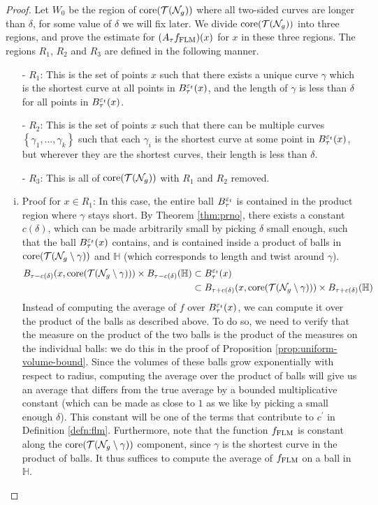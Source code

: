 \begin{proof}
  Let $W_0$ be the region of $\mathrm{core}(\mathcal{T}(\mathcal{N}_g))$ where all two-sided curves are longer than $\delta$, for some value of $\delta$ we will fix later.
  We divide $\mathrm{core}(\mathcal{T}(\mathcal{N}_g))$ into three regions, and prove the estimate for $(A_\tau f_{\mathrm{FLM}})(x)$ for $x$ in these three regions.
  The regions $R_1$, $R_2$ and $R_3$ are defined in the following manner.
  \begin{itemize}
  \item[-] $R_1$: This is the set of points $x$ such that there exists a unique curve $\gamma$ which is the shortest curve at all points in $B_{\tau}^{\varepsilon_t}(x)$, and the length of $\gamma$ is less than $\delta$ for all points in $B_{\tau}^{\varepsilon_t}(x)$.
  \item[-] $R_2$: This is the set of points $x$ such that there can be multiple curves $\left\{ \gamma_1, \ldots, \gamma_k \right\}$ such that each $\gamma_i$ is the shortest curve at some point in $B_{\tau}^{\varepsilon_t}(x)$, but wherever they are the shortest curves, their length is less than $\delta$.
  \item[-] $R_3$: This is all of $\mathrm{core}(\mathcal{T}(\mathcal{N}_g))$ with $R_1$ and $R_2$ removed.
\end{itemize}
  \begin{enumerate}[(i)]
  \item Proof for $x \in R_1$: In this case, the entire ball $B_{\tau}^{\varepsilon_t}$ is contained in the product region where $\gamma$ stays short.
    By Theorem \ref{thm:prno}, there exists a constant $c(\delta)$, which can be made arbitrarily small by picking $\delta$ small enough, such that the ball $B_{\tau}^{\varepsilon_t}(x)$ contains, and is contained inside a product of balls in $\mathrm{core}(\mathcal{T}(\mathcal{N}_g \setminus \gamma))$ and $\mathbb{H}$ (which corresponds to length and twist around $\gamma$).
    \begin{align*}
      B_{\tau - c(\delta)}(x, \mathrm{core}(\mathcal{T}(\mathcal{N}_g \setminus \gamma))) \times B_{\tau - c(\delta)}(\mathbb{H}) &\subset B_{\tau}^{\varepsilon_t}(x) \\
      &\subset B_{\tau + c(\delta)}(x, \mathrm{core}(\mathcal{T}(\mathcal{N}_g \setminus \gamma))) \times B_{\tau + c(\delta)}(\mathbb{H})
    \end{align*}
    Instead of computing the average of $f$ over $B_{\tau}^{\varepsilon_t}(x)$, we can compute it over the product of the balls as described above.
    To do so, we need to verify that the measure on the product of the two balls is the product of the measures on the individual balls: we do this in the proof of Proposition \ref{prop:uniform-volume-bound}.
    Since the volumes of these balls grow exponentially with respect to radius, computing the average over the product of balls will give us an average that differs from the true average by a bounded multiplicative constant (which can be made as close to $1$ as we like by picking a small enough $\delta$).
    This constant will be one of the terms that contribute to $c^{\prime}$ in Definition \ref{defn:flm}.
    Furthermore, note that the function $f_{\mathrm{FLM}}$ is constant along the $\mathrm{core}(\mathcal{T}(\mathcal{N}_g \setminus \gamma))$ component, since $\gamma$ is the shortest curve in the product of balls.
    It thus suffices to compute the average of $f_{\mathrm{FLM}}$ on a ball in $\mathbb{H}$.


\end{enumerate}
\end{proof}
